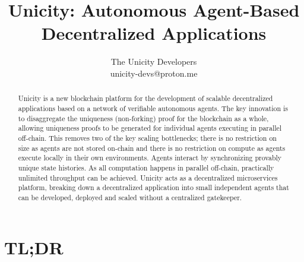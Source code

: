 \documentclass{article}
\title{Unicity: Autonomous Agent-Based Decentralized Applications}
\author{The Unicity Developers\\unicity-devs@proton.me}
\date{}
\begin{document}
\maketitle



\begin{abstract}
\noindent  Unicity is a new blockchain platform for the development of scalable decentralized applications based on a network of verifiable autonomous agents. The key innovation is to disaggregate the uniqueness (non-forking) proof for the blockchain as a whole, allowing uniqueness proofs to be generated for individual agents executing in parallel off-chain. This removes two of the key scaling bottlenecks; there is no restriction on size as agents are not stored on-chain and there is no restriction on compute as  agents execute locally in their own environments. Agents interact by synchronizing provably unique state histories. As all computation happens in parallel off-chain, practically unlimited throughput can be achieved. Unicity acts as a decentralized microservices platform, breaking down a decentralized application into small independent agents that can be developed, deployed and scaled without a centralized gatekeeper.
\end{abstract}

\section*{TL;DR}
\end{document}
